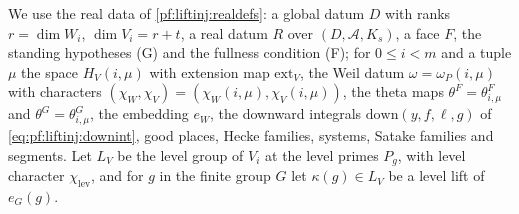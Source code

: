 We use the real data of \cref{pf:liftinj:realdefs}: a global datum $D$ with ranks $r=\dim W_i$, $\dim V_i=r+t$, a real datum $R$
over $(D,\mathcal A,K_s)$, a face $F$, the standing hypotheses (G) and the fullness condition (F); for $0\le i<m$ and a tuple
$\mu$ the space $H_V(i,\mu)$ with extension map $\mathrm{ext}_V$, the Weil datum $\omega=\omega_P(i,\mu)$ with characters
$(\chi_W,\chi_V)=(\chi_W(i,\mu),\chi_V(i,\mu))$, the theta maps $\theta^F=\theta^F_{i,\mu}$ and $\theta^G=\theta^G_{i,\mu}$, the
embedding $e_W$, the downward integrals $\mathrm{down}(y,f,\ell,g)$ of \cref{eq:pf:liftinj:downint}, good places, Hecke
families, systems, Satake families and segments. Let $L_V$ be the level group of $V_i$ at the level primes $P_g$, with level
character $\chi_{\mathrm{lev}}$, and for $g$ in the finite group $G$ let $\kappa(g)\in L_V$ be a level lift of $e_G(g)$.

